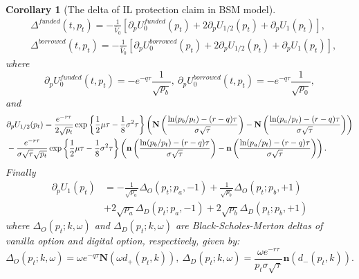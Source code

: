 \documentclass[pdftex,11pt,a4paper] {article}
\newtheorem{corollary}{Corollary}[section]
\begin{document}
\begin{corollary}[The delta of IL protection claim in BSM model]
\begin{equation}
\begin{split}
& \Delta ^{funded}(t,p_{t})=-\frac{1}{\bar{V}_{0}}\left[ \partial
_{p}U_{0}^{funded}(p_{t})+2\partial _{p}U_{1/2}(p_{t})+\partial
_{p}U_{1}(p_{t})\right] , \\
& \Delta ^{borrowed}(t,p_{t})=-\frac{1}{\bar{V}_{0}}\left[ \partial
_{p}U_{0}^{borrowed}(p_{t})+2\partial _{p}U_{1/2}(p_{t})+\partial
_{p}U_{1}(p_{t})\right] ,
\end{split}
\label{eq:bs7a}
\end{equation}%
where
\begin{equation}
\partial _{p}U_{0}^{funded}(t,p_{t})=-e^{-q\tau }\frac{1}{\sqrt{p_{b}}},\
\partial _{p}U_{0}^{borrowed}(t,p_{t})=-e^{-q\tau }\frac{1}{\sqrt{p_{0}}},
\label{eq:bs7b}
\end{equation}%
and
\begin{equation}
\begin{split}
& \partial _{p}U_{1/2}(p_{t})=\frac{e^{-r\tau }}{2\sqrt{p_{t}}}\exp \left\{ \frac{1}{2}%
\mu \tau -\frac{1}{8}\sigma ^{2}\tau \right\} \left( \mathbf{N}\left( \frac{%
\ln (p_{b}/p_{t})-(r-q)\tau }{\sigma \sqrt{\tau }}\right) -\mathbf{N}\left(
\frac{\ln (p_{a}/p_{t})-(r-q)\tau }{\sigma \sqrt{\tau }}\right) \right) \\
& -\frac{e^{-r\tau }}{\sigma \sqrt{\tau }\sqrt{p_{t}}}\exp \left\{ \frac{1}{2}\mu \tau
-\frac{1}{8}\sigma ^{2}\tau \right\} \left( \mathbf{n}\left( \frac{\ln
(p_{b}/p_{t})-(r-q)\tau }{\sigma \sqrt{\tau }}\right) -\mathbf{n}\left(
\frac{\ln (p_{a}/p_{t})-(r-q)\tau }{\sigma \sqrt{\tau }}\right) \right) .
\end{split}
\label{eq:bs8}
\end{equation}%
Finally
\begin{equation}
\begin{split}
\partial _{p}U_{1}(p_{t})& =-\frac{1}{\sqrt{p_{a}}}\Delta
_{O}(p_{t};p_{a},-1)+\frac{1}{\sqrt{p_{b}}}\Delta _{O}(p_{t};p_{b},+1) \\
& +2\sqrt{p_{a}}\Delta _{D}(p_{t};p_{a},-1)+2\sqrt{p_{b}}\Delta
_{D}(p_{t};p_{b},+1)
\end{split}
\label{eq:bs7}
\end{equation}%
where $\Delta _{O}(p_{t};k,\omega)$ and $\Delta _{D}(p_{t};k,\omega)$ are
Black-Scholes-Merton deltas of vanilla option and digital option,
respectively, given by:
\begin{equation}
\Delta _{O}(p_{t};k,\omega )=\omega e^{-q\tau }\mathbf{N}(\omega d_{+}(p_{t},k)),\ \Delta
_{D}(p_{t};k,\omega )=\frac{\omega e^{-r\tau }}{p_{t}\sigma \sqrt{\tau }}%
\mathbf{n}(d_{-}(p_{t},k)).  \label{eq:bs8a}
\end{equation}
\end{corollary}
\end{document}
